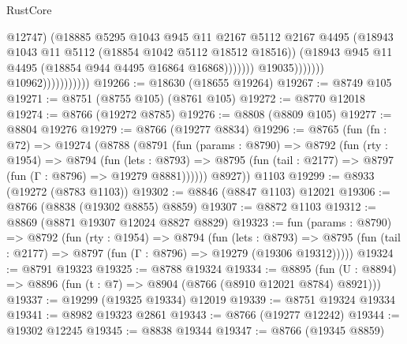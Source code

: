 \begin{lexlean}{RustCore}
\begin{coremodule}
                                                  @12747)
                                                (@18885
                                                  @5295
                                                  @1043
                                                  @945
                                                  @11
                                                  @2167
                                                  @5112
                                                  @2167
                                                  @4495
                                                  (@18943
                                                    @1043
                                                    @11
                                                    @5112
                                                    (@18854 @1042 @5112 @18512 @18516))
                                                  (@18943
                                                    @945
                                                    @11
                                                    @4495
                                                    (@18854 @944 @4495 @16864 @16868)))))))
                                        @19035)))))))
                          @10962)))))))))))
@19266 := @18630 (@18655 @19264)
@19267 := @8749 @105
@19271 := @8751 (@8755 @105) (@8761 @105)
@19272 := @8770 @12018
@19274 := @8766 (@19272 @8785)
@19276 := @8808 (@8809 @105)
@19277 := @8804 @19276
@19279 := @8766 (@19277 @8834)
@19296 := @8765
    (fun (fn : @72) =>
    @19274
      (@8788
        (@8791
          (fun (params : @8790) =>
          @8792
            (fun (rty : @1954) =>
            @8794
              (fun (lets : @8793) =>
              @8795 (fun (tail : @2177) => @8797 (fun (Γ : @8796) => @19279 @8881))))))
        @8927))
    @1103
@19299 := @8933 (@19272 (@8783 @1103))
@19302 := @8846 (@8847 @1103) @12021
@19306 := @8766 (@8838 (@19302 @8855) @8859)
@19307 := @8872 @1103
@19312 := @8869 (@8871 @19307 @12024 @8827 @8829)
@19323 := fun (params : @8790) =>
  @8792
    (fun (rty : @1954) =>
    @8794
      (fun (lets : @8793) =>
      @8795 (fun (tail : @2177) => @8797 (fun (Γ : @8796) => @19279 (@19306 @19312)))))
@19324 := @8791 @19323
@19325 := @8788 @19324
@19334 := @8895
    (fun (U : @8894) => @8896 (fun (t : @7) => @8904 (@8766 (@8910 @12021 @8784) @8921)))
@19337 := @19299 (@19325 @19334) @12019
@19339 := @8751 @19324 @19334
@19341 := @8982 @19323 @2861
@19343 := @8766 (@19277 @12242)
@19344 := @19302 @12245
@19345 := @8838 @19344
@19347 := @8766 (@19345 @8859)

\end{coremodule}
\end{lexlean}
